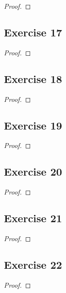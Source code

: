 \documentclass[14pt]{extarticle}
\begin{document}
\begin{proof}

\end{proof}

\subsection{Exercise 17}

\begin{proof}

\end{proof}

\subsection{Exercise 18}

\begin{proof}

\end{proof}

\subsection{Exercise 19}

\begin{proof}

\end{proof}

\subsection{Exercise 20}

\begin{proof}

\end{proof}

\subsection{Exercise 21}

\begin{proof}

\end{proof}

\subsection{Exercise 22}

\begin{proof}

\end{proof}
\end{document}
